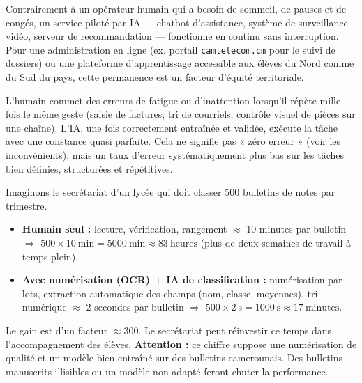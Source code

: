 \documentclass[11pt]{article}
\newcommand{\cle}[1]{{\popxbold\color{popdark}#1}}
\begin{document}
\begin{definition}[Disponibilité 24h/24 et 7j/7]
Contrairement à un opérateur humain qui a besoin de sommeil, de pauses et de congés, un service piloté par IA — chatbot d'assistance, système de surveillance vidéo, serveur de recommandation — fonctionne en continu sans interruption. Pour une administration en ligne (ex. portail \texttt{camtelecom.cm} pour le suivi de dossiers) ou une plateforme d'apprentissage accessible aux élèves du Nord comme du Sud du pays, cette permanence est un facteur d'équité territoriale.
\end{definition}

\begin{definition}
L'humain commet des erreurs de fatigue ou d'inattention lorsqu'il répète mille fois le même geste (saisie de factures, tri de courriels, contrôle visuel de pièces sur une chaîne). L'IA, une fois correctement entraînée et validée, exécute la tâche avec une \cle{constance} quasi parfaite. Cela ne signifie pas « zéro erreur » (voir les inconvénients), mais un taux d'erreur systématiquement plus bas sur les tâches bien définies, structurées et répétitives.
\end{definition}

\begin{exemplebox}
Imaginons le secrétariat d'un lycée qui doit classer 500 bulletins de notes par trimestre.
\begin{itemize}
    \item \textbf{Humain seul :} lecture, vérification, rangement $\approx$ 10 minutes par bulletin $\Rightarrow$ $500 \times 10\ \text{min} = 5000\ \text{min} \approx 83\ \text{heures}$ (plus de deux semaines de travail à temps plein).
    \item \textbf{Avec numérisation (OCR) + IA de classification :} numérisation par lots, extraction automatique des champs (nom, classe, moyennes), tri numérique $\approx$ 2 secondes par bulletin $\Rightarrow$ $500 \times 2\ \text{s} = 1000\ \text{s} \approx 17\ \text{minutes}$.
\end{itemize}
Le gain est d'un facteur $\approx 300$. Le secrétariat peut réinvestir ce temps dans l'accompagnement des élèves.
\tcblower
\textbf{Attention :} ce chiffre suppose une numérisation de qualité et un modèle bien entraîné sur des bulletins camerounais. Des bulletins manuscrits illisibles ou un modèle non adapté feront chuter la performance.
\end{exemplebox}
\end{document}
